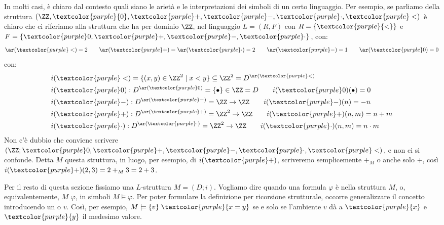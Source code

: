 \begin{note}
    In molti casi, è chiaro dal contesto quali siano le arietà e le interpretazioni dei simboli di un certo linguaggio. Per esempio, se parliamo della struttura
    $(\ZZ, \textcolor{purple}{0}, \textcolor{purple}+,\textcolor{purple}-, \textcolor{purple}\cdot, \textcolor{purple}<)$ è chiaro che ci riferiamo alla struttura che ha per dominio $\ZZ$,
    nel linguaggio $L = (R,F)$ con $R = \{\textcolor{purple}{<}\}$ e $F = \{\textcolor{purple}0, \textcolor{purple}+,\textcolor{purple}-, \textcolor{purple}\cdot\}$, con:
    \[ \ar(\textcolor{purple}<) = 2 \qquad \ar(\textcolor{purple}+) = \ar(\textcolor{purple}\cdot) = 2 \qquad \ar(\textcolor{purple}-) = 1 \qquad \ar(\textcolor{purple}0) = 0
    \]
    con:
    \begin{align*}
        &i(\textcolor{purple}<) = \{ (x,y) \in \ZZ^2 \mid x < y \} \subseteq \ZZ^2 = D^{\ar(\textcolor{purple}<)} \\
        &i(\textcolor{purple}0) : D^{\ar(\textcolor{purple}0)} = \{\bullet\} \in \ZZ = D \qquad i(\textcolor{purple}0)(\bullet) = 0\\
        &i(\textcolor{purple}-) : D^{\ar(\textcolor{purple}-)} = \ZZ \to \ZZ \qquad i(\textcolor{purple}-)(n) = -n \\
        &i(\textcolor{purple}+) : D^{\ar(\textcolor{purple}+)} = \ZZ^2 \to \ZZ \qquad i(\textcolor{purple}+)(n,m) = n+m \\
        &i(\textcolor{purple}\cdot) : D^{\ar(\textcolor{purple}\cdot)} = \ZZ^2 \to \ZZ \qquad i(\textcolor{purple}\cdot)(n,m) = n \cdot m
    \end{align*}
    Non c'è dubbio che conviene scrivere $(\ZZ; \textcolor{purple}0, \textcolor{purple}+,\textcolor{purple}-, \textcolor{purple}\cdot, \textcolor{purple}<)$, e non ci si confonde.
    Detta $M$ questa struttura, in luogo, per esempio, di $i(\textcolor{purple}+)$, scriveremo semplicemente $+_M$ o anche solo $+$, così $i(\textcolor{purple}+)(2,3) = 2 +_M 3 = 2+3$.
\end{note}

Per il resto di questa sezione fissiamo una $L$-struttura $M = (D;i)$. Vogliamo dire quando una formula $\varphi$ è  nella struttura $M$, o, equivalentemente, $M$  $\varphi$,
in simboli $M \models \varphi$. Per poter formulare la definizione per ricorsione strutturale, occorre generalizzare il concetto introducendo un  o  $v$.
Così, per esempio, $M \models \{v\} \; \textcolor{purple}{x = y}$ se e solo se l'ambiente $v$ dà a $\textcolor{purple}{x}$ e $\textcolor{purple}{y}$ il medesimo valore.


